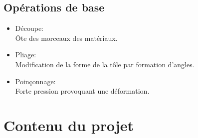 \documentclass{beamer}
\begin{document}
\subsection{Opérations de base}
\begin{frame}
    \begin{itemize}
        \item Découpe:\\
            Ôte des morceaux des matériaux.
        \item Pliage:\\
            Modification de la forme de la tôle par formation d'angles.
        \item Poinçonnage:\\
            Forte pression provoquant une déformation.
    \end{itemize}
\end{frame}

\section{Contenu du projet}
\end{document}
